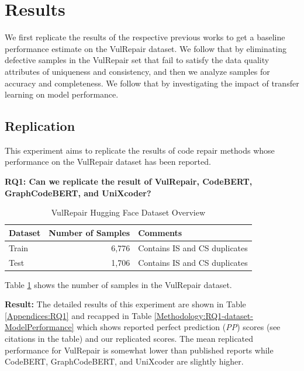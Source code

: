 \section{Results}\label{Result}

We first replicate the results of the respective previous works to get a baseline performance estimate on the VulRepair dataset.
We follow that by eliminating defective samples in the VulRepair set that fail to satisfy the data quality attributes of uniqueness and consistency, and then we analyze samples for accuracy and completeness.
We follow that by investigating the impact of transfer learning on model performance.

\subsection{Replication}

This experiment aims to replicate the results of code repair methods whose performance on the VulRepair dataset has been reported.

\textbf{RQ1: Can we replicate the result of VulRepair, CodeBERT, GraphCodeBERT, and UniXcoder?} 


\begin{table}[h]
\centering
  \caption{VulRepair Hugging Face Dataset Overview}
  \label{Methodology:RQ1-dataset}
  \begin{tabular}{|l|r|l|}
    \hline
    Dataset&Number of Samples&Comments\\
     \hline
    Train & 6,776    & Contains IS and CS duplicates\\
     \hline
    Test  & 1,706    & Contains IS and CS duplicates\\
   \hline
\end{tabular}
\end{table}

Table \ref{Methodology:RQ1-dataset} shows the number of samples in the VulRepair dataset.

\textbf{Result:} The detailed results of this experiment are shown in Table \ref{Appendices:RQ1} and recapped in Table \ref{Methodology:RQ1-dataset-ModelPerformance} which shows reported perfect prediction (\emph{PP}) scores (see citations in the table) and our replicated scores.
The mean replicated performance for VulRepair is somewhat lower than published reports while CodeBERT, GraphCodeBERT, and UniXcoder are slightly higher.


